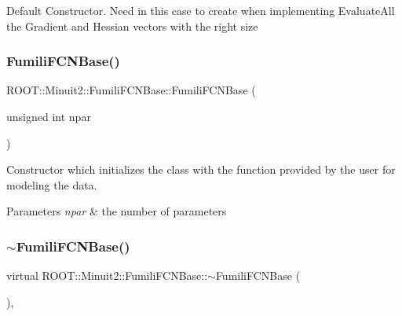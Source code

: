 Default Constructor. Need in this case to create when implementing Evaluate\+All the Gradient and Hessian vectors with the right size \mbox{\label{classROOT_1_1Minuit2_1_1FumiliFCNBase_ad20bc861c81429cd75a0b14d5449f066}} 
\subsubsection{\texorpdfstring{FumiliFCNBase()}{FumiliFCNBase()}\hspace{0.1cm}{\footnotesize\ttfamily [2/6]}}
{\footnotesize\ttfamily R\+O\+O\+T\+::\+Minuit2\+::\+Fumili\+F\+C\+N\+Base\+::\+Fumili\+F\+C\+N\+Base (\begin{DoxyParamCaption}\item[{unsigned int}]{npar }\end{DoxyParamCaption})\hspace{0.3cm}{\ttfamily [inline]}}

Constructor which initializes the class with the function provided by the user for modeling the data.


\begin{DoxyParams}{Parameters}
{\em npar} & the number of parameters \\
\hline
\end{DoxyParams}
\mbox{\label{classROOT_1_1Minuit2_1_1FumiliFCNBase_a94961223a3baa0a131461be70a55a4e3}} 
\subsubsection{\texorpdfstring{$\sim$FumiliFCNBase()}{~FumiliFCNBase()}\hspace{0.1cm}{\footnotesize\ttfamily [1/3]}}
{\footnotesize\ttfamily virtual R\+O\+O\+T\+::\+Minuit2\+::\+Fumili\+F\+C\+N\+Base\+::$\sim$\+Fumili\+F\+C\+N\+Base (\begin{DoxyParamCaption}{ }\end{DoxyParamCaption})\hspace{0.3cm}{\ttfamily [inline]}, {\ttfamily [virtual]}}

